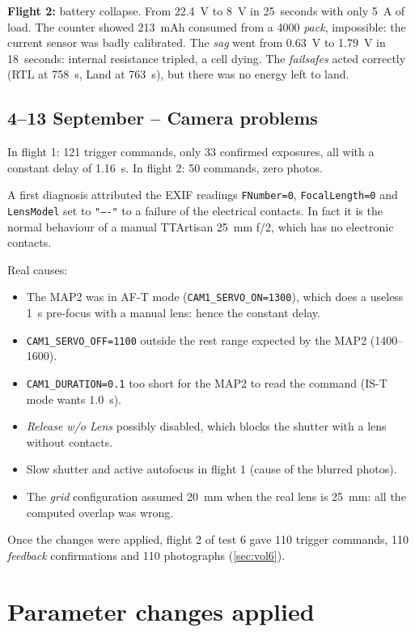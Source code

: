 \textbf{Flight 2:} battery collapse. From 22.4~V to 8~V in 25~seconds with only 5~A of load. The counter showed 213~mAh consumed from a 4000 \emph{pack}, impossible: the current sensor was badly calibrated. The \emph{sag} went from 0.63~V to 1.79~V in 18~seconds: internal resistance tripled, a cell dying. The \emph{failsafes} acted correctly (RTL at 758~s, Land at 763~s), but there was no energy left to land.

\subsection{4--13 September -- Camera problems}
\label{subsec:problemes-camera}

In flight 1: 121 trigger commands, only 33 confirmed exposures, all with a constant delay of 1.16~s. In flight 2: 50 commands, zero photos.

A first diagnosis attributed the EXIF readings \texttt{FNumber=0}, \texttt{FocalLength=0} and \texttt{LensModel} set to \texttt{"----"} to a failure of the electrical contacts. In fact it is the normal behaviour of a manual TTArtisan 25~mm f/2, which has no electronic contacts.

Real causes:
\begin{itemize}
    \item The MAP2 was in AF-T mode (\texttt{CAM1\_SERVO\_ON=1300}), which does a useless 1~s pre-focus with a manual lens: hence the constant delay.
    \item \texttt{CAM1\_SERVO\_OFF=1100} outside the rest range expected by the MAP2 (1400--1600).
    \item \texttt{CAM1\_DURATION=0.1} too short for the MAP2 to read the command (IS-T mode wants 1.0~s).
    \item \emph{Release w/o Lens} possibly disabled, which blocks the shutter with a lens without contacts.
    \item Slow shutter and active autofocus in flight 1 (cause of the blurred photos).
    \item The \emph{grid} configuration assumed 20~mm when the real lens is 25~mm: all the computed overlap was wrong.
\end{itemize}

Once the changes were applied, flight 2 of test 6 gave 110 trigger commands, 110 \emph{feedback} confirmations and 110 photographs (\cref{sec:vol6}).

\section{Parameter changes applied}
\label{sec:canvis-aplicats}

